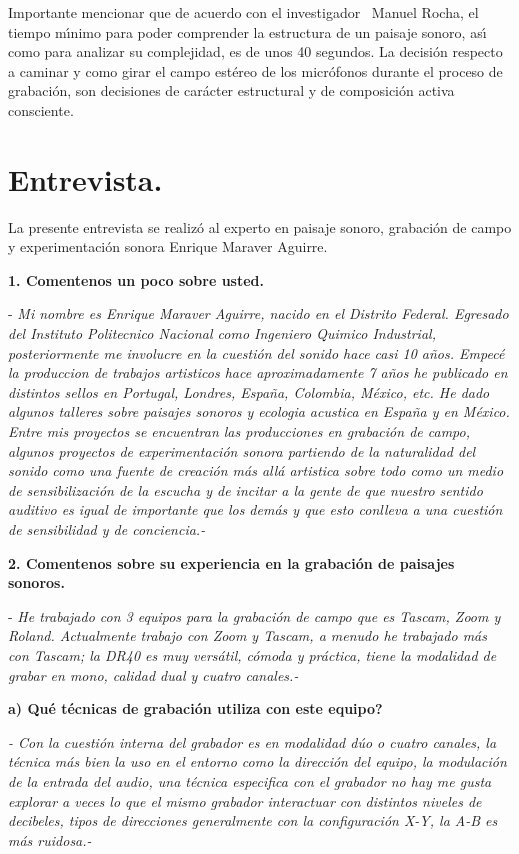 Importante mencionar que de acuerdo con el investigador \ Manuel Rocha, el
tiempo m\'{\i}nimo para poder comprender la estructura de un paisaje sonoro,
as\'{\i} como para analizar su complejidad, es de unos 40 segundos. La
decisi\'{o}n respecto a caminar y como girar el campo est\'{e}reo de los
micr\'{o}fonos durante el proceso de grabaci\'{o}n, son decisiones de
car\'{a}cter estructural y de composici\'{o}n activa consciente.

\section{Entrevista.}

La presente entrevista se realiz\'{o} al experto en paisaje sonoro,
grabaci\'{o}n de campo y experimentaci\'{o}n sonora Enrique Maraver Aguirre.

\textbf{1. Comentenos un poco sobre usted. }

- \textit{Mi nombre es Enrique Maraver Aguirre, nacido en el Distrito Federal.
Egresado del Instituto Politecnico Nacional como Ingeniero Quimico Industrial,
posteriormente me involucre en la cuesti\'{o}n del sonido hace casi 10
a\~{n}os. Empec\'{e} la produccion de trabajos artisticos hace aproximadamente
7 a\~{n}os he publicado en distintos sellos en Portugal, Londres, Espa\~{n}a,
Colombia, M\'{e}xico, etc. He dado algunos talleres sobre paisajes sonoros y
ecologia acustica en Espa\~{n}a y en M\'{e}xico. Entre mis proyectos se
encuentran las producciones en grabaci\'{o}n de campo, algunos proyectos de
experimentaci\'{o}n sonora partiendo de la naturalidad del sonido como una
fuente de creaci\'{o}n m\'{a}s all\'{a} artistica sobre todo como un medio de
sensibilizaci\'{o}n de la escucha y de incitar a la gente de que nuestro
sentido auditivo es igual de importante que los dem\'{a}s y que esto conlleva
a una cuesti\'{o}n de sensibilidad y de conciencia.-}

\textbf{2. Comentenos sobre su experiencia en la grabaci\'{o}n de paisajes
sonoros.}

- \textit{He trabajado con 3 equipos para la grabaci\'{o}n de campo que es
Tascam, Zoom y Roland. Actualmente trabajo con Zoom y Tascam, a menudo he
trabajado m\'{a}s con Tascam; la DR40 es muy vers\'{a}til, c\'{o}moda y
pr\'{a}ctica, tiene la modalidad de grabar en mono, calidad dual y cuatro
canales.-}

\textbf{a) \textquestiondown Qu\'{e} t\'{e}cnicas de grabaci\'{o}n utiliza con
este equipo? }

\textit{- Con la cuesti\'{o}n interna del grabador es en modalidad d\'{u}o o
cuatro canales, la t\'{e}cnica m\'{a}s bien la uso en el entorno como la
direcci\'{o}n del equipo, la modulaci\'{o}n de la entrada del audio, una
t\'{e}cnica especifica con el grabador no hay me gusta explorar a veces lo que
el mismo grabador interactuar con distintos niveles de decibeles, tipos de
direcciones generalmente con la configuraci\'{o}n X-Y, la A-B es m\'{a}s
ruidosa.-}

